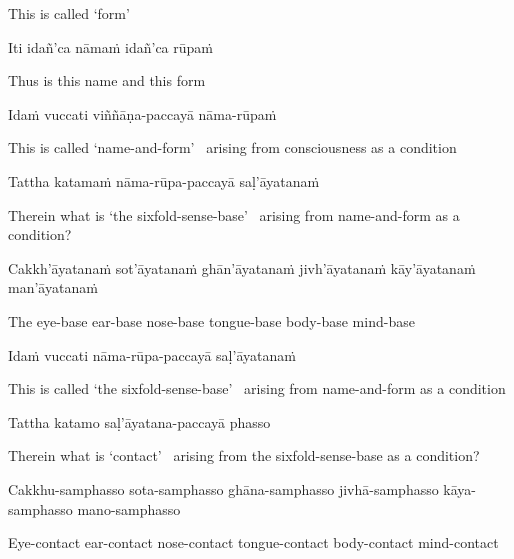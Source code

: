 \begin{english}
  This is called `form'
\end{english}

Iti idañ'ca nāmaṁ idañ'ca rūpaṁ

\begin{english}
  Thus is this name and this form
\end{english}

Idaṁ vuccati viññāṇa-paccayā nāma-rūpaṁ

\begin{english-hang}
  This is called `name-and-form' \breathmark\ arising from consciousness as a condition
\end{english-hang}

Tattha katamaṁ nāma-rūpa-paccayā saḷ'āyatanaṁ

\begin{english-hang}
  Therein what is `the sixfold-sense-base' \breathmark\ arising from name-and-form as a condition?
\end{english-hang}

\begin{pali-hang}
  Cakkh'āyatanaṁ sot'āyatanaṁ ghān'āyatanaṁ jivh'āyatanaṁ kāy'āyatanaṁ man'āyatanaṁ
\end{pali-hang}

\begin{english-hang}
  The eye-base ear-base nose-base tongue-base body-base mind-base
\end{english-hang}

Idaṁ vuccati nāma-rūpa-paccayā saḷ'āyatanaṁ

\begin{english-hang}
  This is called `the sixfold-sense-base' \breathmark\ arising from name-and-form as a condition
\end{english-hang}

Tattha katamo saḷ'āyatana-paccayā phasso

\begin{english-hang}
  Therein what is `contact' \breathmark\ arising from the sixfold-sense-base as a condition?
\end{english-hang}

\begin{pali-hang}
  Cakkhu-samphasso sota-samphasso ghāna-samphasso jivhā-samphasso kāya-samphasso mano-samphasso
\end{pali-hang}

\begin{english-hang}
  Eye-contact ear-contact nose-contact tongue-contact body-contact mind-contact
\end{english-hang}

